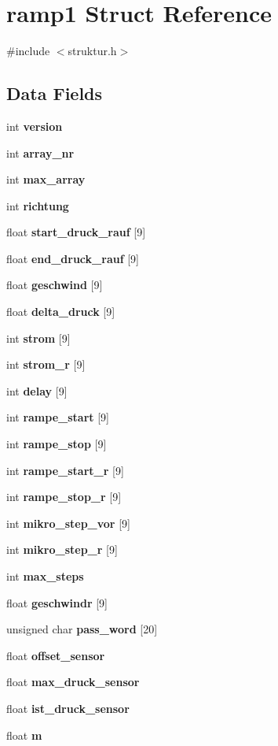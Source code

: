 \section{ramp1 Struct Reference}
\label{structramp1}


{\ttfamily \#include $<$struktur.\+h$>$}

\subsection*{Data Fields}
\begin{DoxyCompactItemize}
\item 
int \textbf{ version}
\item 
int \textbf{ array\+\_\+nr}
\item 
int \textbf{ max\+\_\+array}
\item 
int \textbf{ richtung}
\item 
float \textbf{ start\+\_\+druck\+\_\+rauf} [9]
\item 
float \textbf{ end\+\_\+druck\+\_\+rauf} [9]
\item 
float \textbf{ geschwind} [9]
\item 
float \textbf{ delta\+\_\+druck} [9]
\item 
int \textbf{ strom} [9]
\item 
int \textbf{ strom\+\_\+r} [9]
\item 
int \textbf{ delay} [9]
\item 
int \textbf{ rampe\+\_\+start} [9]
\item 
int \textbf{ rampe\+\_\+stop} [9]
\item 
int \textbf{ rampe\+\_\+start\+\_\+r} [9]
\item 
int \textbf{ rampe\+\_\+stop\+\_\+r} [9]
\item 
int \textbf{ mikro\+\_\+step\+\_\+vor} [9]
\item 
int \textbf{ mikro\+\_\+step\+\_\+r} [9]
\item 
int \textbf{ max\+\_\+steps}
\item 
float \textbf{ geschwindr} [9]
\item 
unsigned char \textbf{ pass\+\_\+word} [20]
\item 
float \textbf{ offset\+\_\+sensor}
\item 
float \textbf{ max\+\_\+druck\+\_\+sensor}
\item 
float \textbf{ ist\+\_\+druck\+\_\+sensor}
\item 
float \textbf{ m}
\item 

\end{DoxyCompactItemize}
